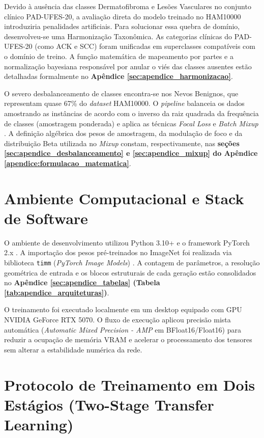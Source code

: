 \documentclass[oneside,english,brazilian]{UNISINOSmonografia}
\begin{document}
Devido à ausência das classes Dermatofibroma e Lesões Vasculares no conjunto clínico PAD-UFES-20, a avaliação direta do modelo treinado no HAM10000 introduziria penalidades artificiais. Para solucionar essa quebra de domínio, desenvolveu-se uma Harmonização Taxonômica. As categorias clínicas do PAD-UFES-20 (como ACK e SCC) foram unificadas em superclasses compatíveis com o domínio de treino. A função matemática de mapeamento por partes e a normalização bayesiana responsável por anular o viés das classes ausentes estão detalhadas formalmente no \textbf{Apêndice \ref{sec:apendice_harmonizacao}}.

O severo desbalanceamento de classes encontra-se nos Nevos Benignos, que representam quase 67\% do \textit{dataset} HAM10000. O \textit{pipeline} balanceia os dados amostrando as instâncias de acordo com o inverso da raiz quadrada da frequência de classes (amostragem ponderada) e aplica as técnicas \textit{Focal Loss} \cite{lin2017focal} e \textit{Batch Mixup} \cite{zhang2018mixup}. A definição algébrica dos pesos de amostragem, da modulação de foco e da distribuição Beta utilizada no \textit{Mixup} constam, respectivamente, nas \textbf{seções \ref{sec:apendice_desbalanceamento} e \ref{sec:apendice_mixup} do Apêndice \ref{apendice:formulacao_matematica}}.

\section{Ambiente Computacional e Stack de Software}

O ambiente de desenvolvimento utilizou Python 3.10+ e o framework PyTorch 2.x \cite{paszke2019pytorch}. A importação dos pesos pré-treinados no ImageNet foi realizada via biblioteca \texttt{timm} (\textit{PyTorch Image Models}) \cite{wightman2019timm}. A contagem de parâmetros, a resolução geométrica de entrada e os blocos estruturais de cada geração estão consolidados no \textbf{Apêndice \ref{sec:apendice_tabelas} (Tabela \ref{tab:apendice_arquiteturas})}.

O treinamento foi executado localmente em um desktop equipado com GPU NVIDIA GeForce RTX 5070. O fluxo de execução aplicou precisão mista automática (\textit{Automatic Mixed Precision - AMP} em BFloat16/Float16) para reduzir a ocupação de memória VRAM e acelerar o processamento dos tensores sem alterar a estabilidade numérica da rede.

\section{Protocolo de Treinamento em Dois Estágios (Two-Stage Transfer Learning)}
\end{document}
